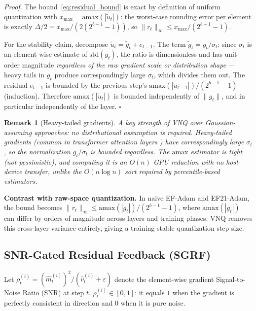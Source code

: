 \documentclass[10pt,twocolumn]{article}
\newtheorem{remark}{Remark}
\begin{document}
\textit{Proof.}
The bound~\eqref{eq:residual_bound} is exact by definition of uniform
quantization with $x_{\max} = \mathrm{amax}(|\tilde{u}_t|)$: the
worst-case rounding error per element is exactly $\Delta/2 =
x_{\max}/(2(2^{b-1}-1))$, so $\|r_t\|_\infty \le x_{\max}/(2^{b-1}-1)$.

For the stability claim, decompose $\tilde{u}_t = \tilde{g}_t + e_{t-1}$.
The term $\tilde{g}_t = g_t / \sigma_t$: since $\sigma_t$ is an
element-wise estimate of $\mathrm{std}(g_t)$, the ratio is
dimensionless and has unit-order magnitude \emph{regardless of the
raw gradient scale or distribution shape} — heavy tails in $g_t$
produce correspondingly large $\sigma_t$, which divides them out.
The residual $e_{t-1}$ is bounded by the previous step's
$\mathrm{amax}(|\tilde{u}_{t-1}|)/(2^{b-1}-1)$ (induction).
Therefore $\mathrm{amax}(|\tilde{u}_t|)$ is bounded independently of
$\|g_t\|$, and in particular independently of the layer. \hfill$\square$

\begin{remark}[Heavy-tailed gradients]
A key strength of VNQ over Gaussian-assuming approaches: no
distributional assumption is required.  Heavy-tailed gradients (common
in transformer attention layers \cite{zhang2020adaptive}) have
correspondingly large $\sigma_t$, so the normalization $g_t/\sigma_t$
is bounded regardless.  The $\mathrm{amax}$ estimator is tight (not
pessimistic), and computing it is an $O(n)$ GPU reduction with no
host-device transfer, unlike the $O(n \log n)$ sort required by
percentile-based estimators.
\end{remark}

\textbf{Contrast with raw-space quantization.}  In naive EF-Adam and
EF21-Adam, the bound becomes
$\|r_t\|_\infty \le \mathrm{amax}(|g_t|)/(2^{b-1}-1)$,
where $\mathrm{amax}(|g_t|)$ can differ by orders of magnitude across
layers and training phases.  VNQ removes this cross-layer variance
entirely, giving a training-stable quantization step size.

\subsection{SNR-Gated Residual Feedback (SGRF)}

Let $\rho_t^{(i)} = (\hat{m}_t^{(i)})^2 / (\hat{v}_t^{(i)} + \varepsilon)$
denote the element-wise gradient Signal-to-Noise Ratio (SNR) at step
$t$.  $\rho_t^{(i)} \in [0,1]$: it equals $1$ when the gradient is
perfectly consistent in direction and $0$ when it is pure noise.
\end{document}

